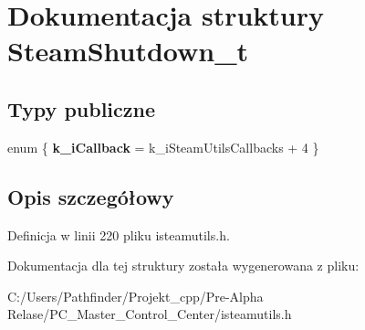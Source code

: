 \hypertarget{struct_steam_shutdown__t}{}\section{Dokumentacja struktury Steam\+Shutdown\+\_\+t}
\label{struct_steam_shutdown__t}
\subsection*{Typy publiczne}
\begin{DoxyCompactItemize}
\item 
\mbox{\label{struct_steam_shutdown__t_af89188395e43bd352ee24d114e9f535f}} 
enum \{ {\bfseries k\+\_\+i\+Callback} = k\+\_\+i\+Steam\+Utils\+Callbacks + 4
 \}
\end{DoxyCompactItemize}


\subsection{Opis szczegółowy}


Definicja w linii 220 pliku isteamutils.\+h.



Dokumentacja dla tej struktury została wygenerowana z pliku\+:\begin{DoxyCompactItemize}
\item 
C\+:/\+Users/\+Pathfinder/\+Projekt\+\_\+cpp/\+Pre-\/\+Alpha Relase/\+P\+C\+\_\+\+Master\+\_\+\+Control\+\_\+\+Center/isteamutils.\+h\end{DoxyCompactItemize}
